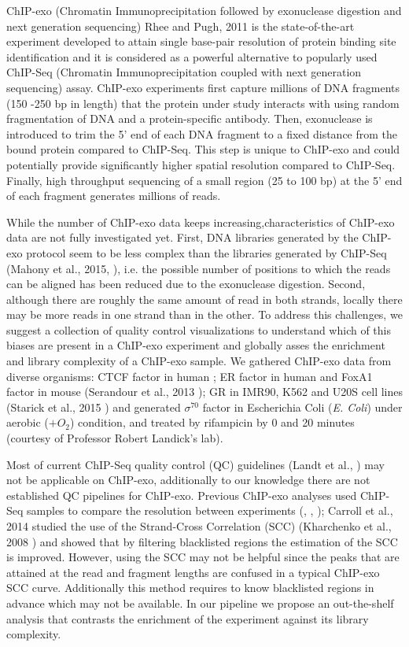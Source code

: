 \documentclass{bmcart}\usepackage[]{graphicx}\usepackage[]{color}
\newcommand{\sig}{\sigma^{70}}
\begin{document}
ChIP-exo (Chromatin Immunoprecipitation followed by exonuclease
digestion and next generation sequencing) Rhee and Pugh, 2011
\cite{exo1} is the state-of-the-art experiment developed to attain
single base-pair resolution of protein binding site identification and
it is considered as a powerful alternative to popularly used ChIP-Seq
(Chromatin Immunoprecipitation coupled with next generation
sequencing) assay. ChIP-exo experiments first capture millions of DNA
fragments (150 -250 bp in length) that the protein under study
interacts with using random fragmentation of DNA and a
protein-specific antibody. Then, exonuclease is introduced to trim the
5' end of each DNA fragment to a fixed distance from the bound protein
compared to ChIP-Seq. This step is unique to ChIP-exo and could
potentially provide significantly higher spatial resolution compared
to ChIP-Seq. Finally, high throughput sequencing of a small region (25
to 100 bp) at the 5' end of each fragment generates millions of reads.

While the number of ChIP-exo data keeps increasing,characteristics of
ChIP-exo data are not fully investigated yet. First, DNA libraries
generated by the ChIP-exo protocol seem to be less complex than the
libraries generated by ChIP-Seq (Mahony et al., 2015,
\cite{exo_review}), i.e. the possible number of positions to which the
reads can be aligned has been reduced due to the exonuclease
digestion. Second, although there are roughly the same amount of read
in both strands, locally there may be more reads in one strand than in
the other. To address this challenges, we suggest a collection of
quality control visualizations to understand which of this biases are
present in a ChIP-exo experiment and globally asses the enrichment and
library complexity of a ChIP-exo sample. We gathered ChIP-exo data
from diverse organisms: CTCF factor in human \cite{exo1}; ER factor in
human and FoxA1 factor in mouse (Serandour et al., 2013
\cite{exoillumina}); GR in IMR90, K562 and U20S cell lines (Starick et
al., 2015 \cite{starick15}) and generated $\sig$ factor in Escherichia
Coli (\emph{E. Coli}) under aerobic ($ + O_2$) condition, and treated
by rifampicin by 0 and 20 minutes (courtesy of Professor Robert
Landick's lab). %

Most of current ChIP-Seq quality control (QC) guidelines (Landt et
al., \cite{encode_qc}) may not be applicable on ChIP-exo, additionally
to our knowledge there are not established QC pipelines for
ChIP-exo. Previous ChIP-exo analyses used ChIP-Seq samples to compare
the resolution between experiments (\cite{exo1}, \cite{exo2},
\cite{exoillumina}); Carroll et al., 2014 \cite{carroll.qc} studied
the use of the Strand-Cross Correlation (SCC) (Kharchenko et al., 2008
\cite{strandcc}) and showed that by filtering blacklisted regions the
estimation of the SCC is improved. However, using the SCC may not be
helpful since the peaks that are attained at the read and fragment
lengths are confused in a typical ChIP-exo SCC curve. Additionally
this method requires to know blacklisted regions in advance which may
not be available. In our pipeline we propose an out-the-shelf analysis
that contrasts the enrichment of the experiment against its library
complexity.
\end{document}
